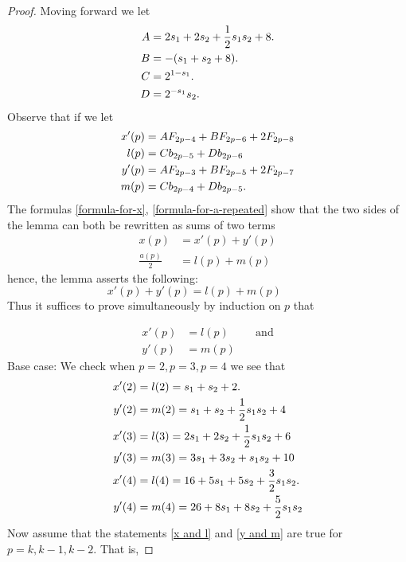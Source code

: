\documentclass[10pt,a4paper]{amsart}
\begin{document}
\begin{proof}
Moving forward we let 
\begin{align}
    A & = 2s_1+2s_2+\displaystyle\frac{1}{2}s_1s_2+8.\notag\\
    B &= -(s_1+s_2+8)\notag.\\
    C &= 2^{1-s_1}.\notag\\
D &= 2^{-s_1}s_2.\notag
\end{align}
Observe that if we let
\begin{align}
    x'(p)&= AF_{2p-4}+BF_{2p-6}+2F_{2p-8}\notag\\
    l(p)&=Cb_{2p-5}+Db_{2p-6}\notag\\
y'(p)&= AF_{2p-3}+BF_{2p-5}+2F_{2p-7}\notag\\
m(p)&=Cb_{2p-4}+Db_{2p-5}.\notag
\end{align}
The formulas \eqref{formula-for-x}, \eqref{formula-for-a-repeated} show that
the two sides of the lemma can both be rewritten as sums of two terms 
\begin{align}   
x(p)&=x'(p)+y'(p)\\
\frac{a(p)}{2}&=l(p)+m(p)
\end{align} 
hence, the lemma asserts the following:
\begin{equation}
   x'(p)+y'(p) =l(p)+m(p) \label{x'_y'} \hspace{1cm}
\end{equation}
Thus it suffices to prove simultaneously by induction on $p$ that

\begin{align}    
x'(p) &= l(p) \label{x and l} \hspace{1cm} \text{and}\\
y'(p) &= m(p) \label{y and m}  
\end{align}
Base case: We check when $p = 2, p=3, p=4$ we see that 
\begin{align}  
x'(2) &= l(2) = s_1 +s_2 + 2.\notag\\
y'(2) &= m(2)   = s_1+ s_2+\displaystyle\frac{1}{2}s_1s_2+4\notag\\
x'(3) &= l(3) = 2s_1 +2s_2 +\displaystyle\frac{1}{2}s_1s_2+6\notag\\
y'(3) &= m(3)   = 3s_1+ 3s_2+s_1s_2+10\notag\\
x'(4) &= l(4) = 16+5s_1 +5s_2 + \displaystyle\frac{3}{2}s_1s_2.\notag\\
y'(4) &= m(4)   = 26+8s_1+8s_2+\displaystyle\frac{5}{2}s_1s_2\notag\\
\end{align}
Now assume that the statements  \eqref{x and l} and \eqref{y and m}
are true for $p = k, k-1, k-2.$ That is, 


\end{proof}
\end{document}
